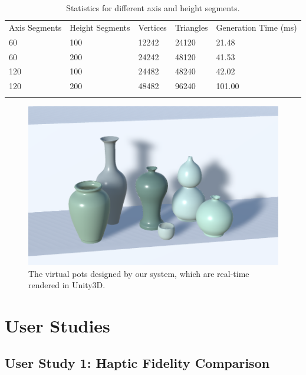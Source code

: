 \documentclass{svjour3}                     %
\begin{document}
\begin{table}
\caption{Statistics for different axis and height segments.}
\label{tab:stats}       %
\begin{tabular}{lllll}
\hline\noalign{\smallskip}
Axis Segments & Height Segments & Vertices & Triangles & Generation Time (ms)\\
\noalign{\smallskip}\hline\noalign{\smallskip}
60 & 100 & 12242 & 24120 & 21.48 \\
60 & 200 & 24242 & 48120 & 41.53 \\
120 & 100 & 24482 & 48240 & 42.02 \\
120 & 200 & 48482 & 96240 & 101.00 \\
\noalign{\smallskip}\hline
\end{tabular}
\end{table}

\begin{figure}
\includegraphics[width=\textwidth]{fig11}
\caption{The virtual pots designed by our system, which are real-time rendered in Unity3D.}
\label{fig:pots}
\end{figure}



\section{User Studies}
\label{sec:study}

\subsection{User Study 1: Haptic Fidelity Comparison}
\end{document}
